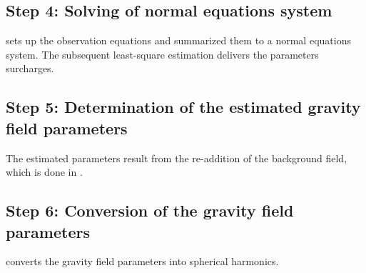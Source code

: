 \subsection{Step 4: Solving of normal equations system}
 sets up the observation equations and summarized them to a normal equations system. The subsequent least-square estimation delivers
the parameters surcharges.

\subsection{Step 5: Determination of the estimated gravity field parameters}
The estimated parameters result from the re-addition of the background field, which is done in .

\subsection{Step 6: Conversion of the gravity field parameters}
 converts the gravity field parameters into spherical harmonics.

